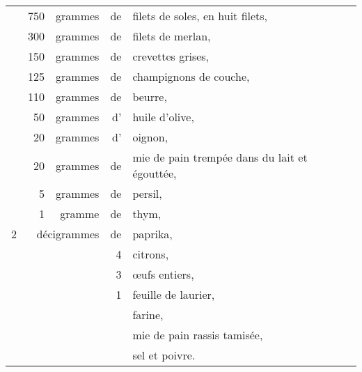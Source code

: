 \footnotesize
\begin{longtable}{rrrrp{16em}}
  & 750 & grammes & de & filets de soles, en huit filets,                                                 \\
  & 300 & grammes & de & filets de merlan,                                                                \\
  & 150 & grammes & de & crevettes grises,                                                                \\
  & 125 & grammes & de & champignons de couche,                                                           \\
  & 110 & grammes & de & beurre,                                                                          \\
  &  50 & grammes & d' & huile d'olive,                                                                   \\
  &  20 & grammes & d' & oignon,                                                                          \\
  &  20 & grammes & de & mie de pain trempée dans du lait et égouttée,                                    \\
  &   5 & grammes & de & persil,                                                                          \\
  &   1 & gramme  & de & thym,                                                                            \\
2 & \multicolumn{2}{r}{décigrammes}   & de & paprika,                                                     \\
  &     &         &  4 & citrons,                                                                         \\
  &     &         &  3 & œufs entiers,                                                                    \\
  &     &         &  1 & feuille de laurier,                                                              \\
  &     &         &    & farine,                                                                          \\
  &     &         &    & mie de pain rassis tamisée,                                                      \\
  &     &         &    & sel et poivre.                                                                   \\
\end{longtable}
\normalsize

